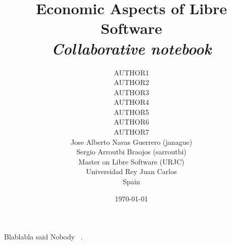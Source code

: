 \documentclass[10pt,a4paper,final]{report}
\title{\textbf{Economic Aspects of Libre Software}\\
		\emph{Collaborative notebook}}
\author{AUTHOR1\\
		AUTHOR2\\
		AUTHOR3\\
		AUTHOR4\\
		AUTHOR5\\
		AUTHOR6\\
		AUTHOR7\\
		Jose Alberto Navas Guerrero (janague)\\
		Sergio Arroutbi Braojos (sarroutbi)\\
        Master on Libre Software (URJC)\\
        Universidad Rey Juan Carlos\\
        Spain	\\
		}
\date{\today}
\begin{document}
\maketitle



\tableofcontents










Blablabla said Nobody ~\cite{Nobody06}.




\end{document}
